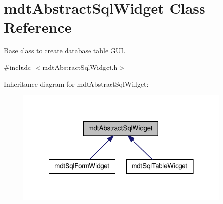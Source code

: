 \hypertarget{classmdt_abstract_sql_widget}{
\section{mdtAbstractSqlWidget Class Reference}
\label{classmdt_abstract_sql_widget}
}


Base class to create database table GUI.  




{\ttfamily \#include $<$mdtAbstractSqlWidget.h$>$}



Inheritance diagram for mdtAbstractSqlWidget:\nopagebreak
\begin{figure}[H]
\begin{center}
\leavevmode
\includegraphics[width=300pt]{classmdt_abstract_sql_widget__inherit__graph}
\end{center}
\end{figure}

